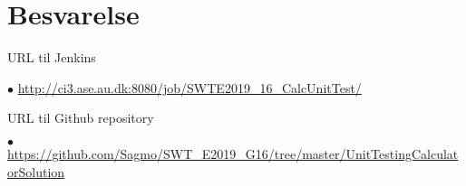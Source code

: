 \section{Besvarelse}

URL til Jenkins 

$\bullet$ \url{http://ci3.ase.au.dk:8080/job/SWTE2019_16_CalcUnitTest/} 

\vspace{0.5cm}

URL til Github repository

$\bullet$ \url{https://github.com/Sagmo/SWT_E2019_G16/tree/master/UnitTestingCalculatorSolution}
